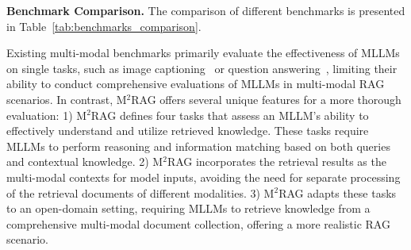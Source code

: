 \textbf{Benchmark Comparison.} The comparison of different benchmarks is presented in Table~\ref{tab:benchmarks_comparison}.

Existing multi-modal benchmarks primarily evaluate the effectiveness of MLLMs on single tasks, such as image captioning~\cite{lin2014microsoft, young2014image} or question answering~\cite{chang2022webqa}, limiting their ability to conduct comprehensive evaluations of MLLMs in multi-modal RAG scenarios. In contrast, M$^2$RAG offers several unique features for a more thorough evaluation: 1) M$^2$RAG defines four tasks that assess an MLLM's ability to effectively understand and utilize retrieved knowledge. These tasks require MLLMs to perform reasoning and information matching based on both queries and contextual knowledge. 2) M$^2$RAG incorporates the retrieval results as the multi-modal contexts for model inputs, avoiding the need for separate processing of the retrieval documents of different modalities. 3) M$^2$RAG adapts these tasks to an open-domain setting, requiring MLLMs to retrieve knowledge from a comprehensive multi-modal document collection, offering a more realistic RAG scenario.

